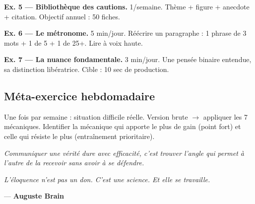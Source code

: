 \documentclass[11pt,a4paper]{article}
\begin{document}
\begin{tcolorbox}[colback=white, colframe=accent, boxrule=0.6pt]
\textbf{Ex. 5 — Bibliothèque des cautions.} 1/semaine. Thème + figure + anecdote + citation. Objectif annuel : 50 fiches.
\end{tcolorbox}

\begin{tcolorbox}[colback=white, colframe=accent, boxrule=0.6pt]
\textbf{Ex. 6 — Le métronome.} 5 min/jour. Réécrire un paragraphe : 1 phrase de 3 mots + 1 de 5 + 1 de 25+. Lire à voix haute.
\end{tcolorbox}

\begin{tcolorbox}[colback=white, colframe=accent, boxrule=0.6pt]
\textbf{Ex. 7 — La nuance fondamentale.} 3 min/jour. Une pensée binaire entendue, sa distinction libératrice. Cible : 10 sec de production.
\end{tcolorbox}

\subsection*{Méta-exercice hebdomadaire}

Une fois par semaine : situation difficile réelle. Version brute $\rightarrow$ appliquer les 7 mécaniques. Identifier la mécanique qui apporte le plus de gain (point fort) et celle qui résiste le plus (entraînement prioritaire).

\vspace{1em}

\begin{tcolorbox}[colback=black!90, colframe=accent, coltext=white, boxrule=1pt, arc=4pt]
\centering\large\textit{Communiquer une vérité dure avec efficacité, c'est trouver l'angle qui permet à l'autre de la recevoir sans avoir à se défendre.}
\end{tcolorbox}

\vspace{0.5em}

\textit{L'éloquence n'est pas un don. C'est une science. Et elle se travaille.}

\vspace{1em}
\hfill --- \textbf{Auguste Brain}
\end{document}
